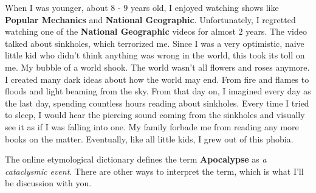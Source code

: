 \begin{essay}
  When I was younger, about $8$ - $9$ years old, I enjoyed watching shows like
  \textbf{Popular Mechanics} and \textbf{National Geographic}. Unfortunately, I
  regretted watching one of the \textbf{National Geographic} videos for almost
  $2$ years. The video talked about sinkholes, which terrorized me. Since I was
  a very optimistic, naive little kid who didn't think anything was wrong in the
  world, this took its toll on me. My bubble of a world shook. The world wasn't
  all flowers and roses anymore. I created many dark ideas about how the world
  may end. From fire and flames to floods and light beaming from the sky. From
  that day on, I imagined every day as the last day, spending countless hours
  reading about sinkholes. Every time I tried to sleep, I would hear the
  piercing sound coming from the sinkholes and visually see it as if I was
  falling into one. My family forbade me from reading any more books on the
  matter. Eventually, like all little kids, I grew out of this phobia.

  The online etymological dictionary defines the term \textbf{Apocalypse} as
  \textit{a cataclysmic event}. There are other ways to interpret the term, which
  is what I'll be discussion with you.


\end{essay}
